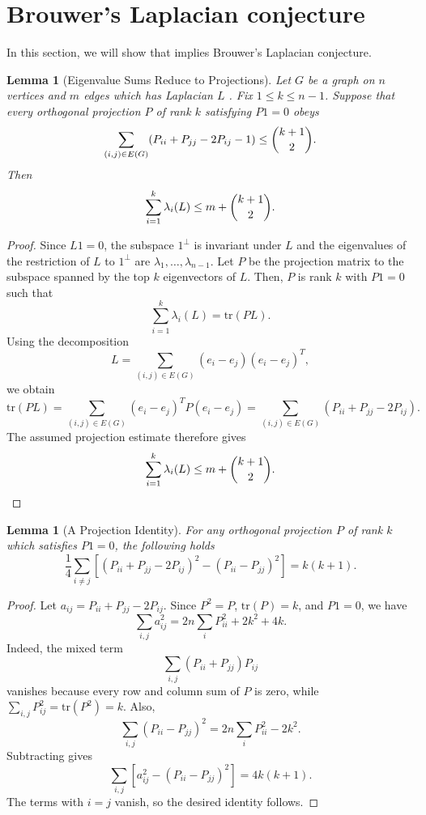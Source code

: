 \documentclass[10pt,reqno]{amsart}
\newtheorem{lemma}[theorem]{Lemma}
\theoremstyle{definition}
\theoremstyle{remark}
\numberwithin{equation}{section}
\newcommand{\tr}{\text{tr} }
\begin{document}
\section{Brouwer's Laplacian conjecture}
In this section, we will show that  implies Brouwer's Laplacian conjecture. %
\begin{lemma}[Eigenvalue Sums Reduce to Projections]\label{lem:projectionreduction}
Let $G$ be a graph on $n$ vertices and $m$ edges which has Laplacian $L$ . Fix $1\le k\le n-1$. Suppose that every orthogonal projection $P$ of rank $k$ satisfying $P1=0$ obeys
\[
    \sum\limits_{(i,j)\in E(G)}(P_{ii}+P_{jj}-2P_{ij}-1)\le \dbinom{k+1}{2}.
\]
Then
\[
    \sum\limits_{i=1}^{k}\lambda_i(L)\le m+\dbinom{k+1}{2}.
\]
\end{lemma}
\begin{proof}
Since $L1=0$, the subspace $1^{\perp}$ is invariant under $L$ and the eigenvalues of the restriction of $L$ to $1^{\perp}$ are $\lambda_1,\ldots,\lambda_{n-1}$. Let $P$ be the projection matrix to the subspace spanned by the top $k$ eigenvectors of $L$. Then, $P$ is rank $k$ with $P1=0$ such that
\[
    \sum\limits_{i=1}^{k}\lambda_i(L)=\tr(PL).
\]
Using the decomposition
\[
    L=\sum\limits_{(i,j)\in E(G)}(e_i-e_j)(e_i-e_j)^T,
\]
we obtain
\[
    \tr(PL)
    =\sum\limits_{(i,j)\in E(G)}(e_i-e_j)^TP(e_i-e_j)
    =\sum\limits_{(i,j)\in E(G)}(P_{ii}+P_{jj}-2P_{ij}).
\]
The assumed projection estimate therefore gives
\[
    \sum\limits_{i=1}^{k}\lambda_i(L)
    \le m+\dbinom{k+1}{2}.
\]
\end{proof}

\begin{lemma}[A Projection Identity]\label{lem:keyidentityprop}
For any orthogonal projection $P$ of rank $k$ which satisfies $P1=0$, the following holds
    \begin{equation} \label{eq:keyidentity}
    \dfrac{1}{4}\sum\limits_{i\ne j}\left[ (P_{ii}+P_{jj}-2P_{ij})^2-(P_{ii}-P_{jj})^2\right]=k(k+1).
\end{equation}
\end{lemma}
\begin{proof}
Let $a_{ij}=P_{ii}+P_{jj}-2P_{ij}$. Since $P^2=P$, $\tr(P)=k$, and $P1=0$, we have
\[
\sum\limits_{i,j} a_{ij}^2
=2n\sum\limits_i P_{ii}^2+2k^2+4k.
\]
Indeed, the mixed term
\[
\sum\limits_{i,j}(P_{ii}+P_{jj})P_{ij}
\]
vanishes because every row and column sum of $P$ is zero, while $\sum_{i,j}P_{ij}^2=\tr(P^2)=k$. Also,
\[
\sum\limits_{i,j}(P_{ii}-P_{jj})^2
=2n\sum\limits_i P_{ii}^2-2k^2.
\]
Subtracting gives
\[
\sum\limits_{i,j}\left[a_{ij}^2-(P_{ii}-P_{jj})^2\right]=4k(k+1).
\]
The terms with $i=j$ vanish, so the desired identity follows.
\end{proof}
\end{document}
